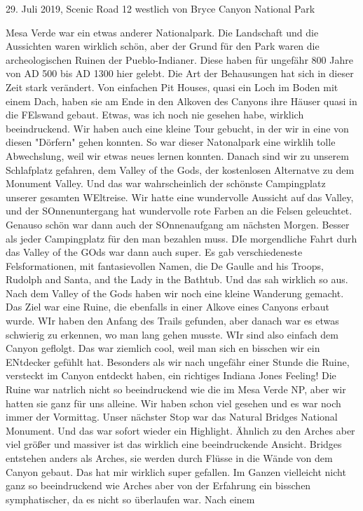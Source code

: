 \documentclass[11pt]{book}
\begin{document}
29. Juli 2019, Scenic Road 12 westlich von Bryce Canyon National Park

Mesa Verde war ein etwas anderer Nationalpark. Die Landschaft und die Aussichten waren wirklich schön, aber der Grund für den Park waren die archeologischen 
Ruinen der Pueblo-Indianer. Diese haben für ungefähr 800 Jahre von AD 500 bis AD 1300 hier gelebt. Die Art der Behausungen hat sich in dieser Zeit stark verändert. 
Von einfachen Pit Houses, quasi ein Loch im Boden mit einem Dach, haben sie am Ende in den Alkoven des Canyons ihre Häuser quasi in die FElswand gebaut. 
Etwas, was ich noch nie gesehen habe, wirklich beeindruckend. Wir haben auch eine kleine Tour gebucht, in der wir in eine von diesen "Dörfern" gehen konnten. So war 
dieser Natonalpark eine wirklih tolle Abwechslung, weil wir etwas neues lernen konnten. Danach sind wir zu unserem Schlafplatz gefahren, dem Valley of the Gods, der 
kostenlosen Alternatve zu dem Monument Valley. Und das war wahrscheinlich der schönste Campingplatz unserer gesamten WEltreise. Wir hatte eine wundervolle Aussicht auf 
das Valley, und der SOnnenuntergang hat wundervolle rote Farben an die Felsen geleuchtet. Genauso schön war dann auch der SOnnenaufgang am nächsten Morgen. Besser 
als jeder Campingplatz für den man bezahlen muss. DIe morgendliche Fahrt durh das Valley of the GOds war dann auch super. Es gab verschiedeneste Felsformationen, 
mit fantasievollen Namen, die De Gaulle and his Troops, Rudolph and Santa, and the Lady in the Bathtub. Und das sah wirklich so aus. Nach dem Valley of the 
Gods haben wir noch eine kleine Wanderung gemacht. Das Ziel war eine Ruine, die ebenfalls in einer Alkove eines Canyons erbaut wurde. WIr haben den Anfang des Trails gefunden,
aber danach war es etwas schwierig zu erkennen, wo man lang gehen musste. WIr sind also einfach dem Canyon geflolgt. Das war ziemlich cool, weil man sich en bisschen 
wir ein ENtdecker gefühlt hat. Besonders als wir nach ungefähr einer Stunde die Ruine, versteckt im Canyon entdeckt haben, ein richtiges Indiana Jones Feeling! Die Ruine 
war natrlich nicht so beeindruckend wie die im Mesa Verde NP, aber wir hatten sie ganz für uns alleine. Wir haben schon viel gesehen und es war noch immer der 
Vormittag. Unser nächster Stop war das Natural Bridges National Monument. Und das war sofort wieder ein Highlight. Ähnlich zu den Arches aber viel größer und massiver 
ist das wirklich eine beeindruckende Ansicht. Bridges entstehen anders als Arches, sie werden durch Flüsse in die Wände von dem Canyon gebaut. Das hat mir wirklich 
super gefallen. Im Ganzen vielleicht nicht ganz so beeindruckend wie Arches aber von der Erfahrung ein bisschen symphatischer, da es nicht so überlaufen war. Nach einem 
\end{document}

